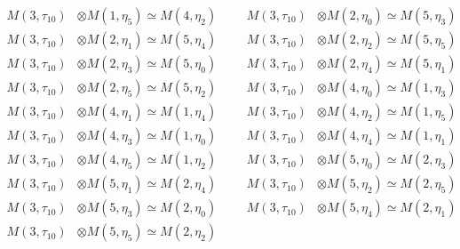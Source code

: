 \begin{align*}
M(3,\tau_{10}) &\otimes M(1,\eta_{5}) \simeq M(4,\eta_{2}) &&& M(3,\tau_{10}) &\otimes M(2,\eta_{0}) \simeq M(5,\eta_{3})\\
M(3,\tau_{10}) &\otimes M(2,\eta_{1}) \simeq M(5,\eta_{4}) &&& M(3,\tau_{10}) &\otimes M(2,\eta_{2}) \simeq M(5,\eta_{5})\\
M(3,\tau_{10}) &\otimes M(2,\eta_{3}) \simeq M(5,\eta_{0}) &&& M(3,\tau_{10}) &\otimes M(2,\eta_{4}) \simeq M(5,\eta_{1})\\
M(3,\tau_{10}) &\otimes M(2,\eta_{5}) \simeq M(5,\eta_{2}) &&& M(3,\tau_{10}) &\otimes M(4,\eta_{0}) \simeq M(1,\eta_{3})\\
M(3,\tau_{10}) &\otimes M(4,\eta_{1}) \simeq M(1,\eta_{4}) &&& M(3,\tau_{10}) &\otimes M(4,\eta_{2}) \simeq M(1,\eta_{5})\\
M(3,\tau_{10}) &\otimes M(4,\eta_{3}) \simeq M(1,\eta_{0}) &&& M(3,\tau_{10}) &\otimes M(4,\eta_{4}) \simeq M(1,\eta_{1})\\
M(3,\tau_{10}) &\otimes M(4,\eta_{5}) \simeq M(1,\eta_{2}) &&& M(3,\tau_{10}) &\otimes M(5,\eta_{0}) \simeq M(2,\eta_{3})\\
M(3,\tau_{10}) &\otimes M(5,\eta_{1}) \simeq M(2,\eta_{4}) &&& M(3,\tau_{10}) &\otimes M(5,\eta_{2}) \simeq M(2,\eta_{5})\\
M(3,\tau_{10}) &\otimes M(5,\eta_{3}) \simeq M(2,\eta_{0}) &&& M(3,\tau_{10}) &\otimes M(5,\eta_{4}) \simeq M(2,\eta_{1})\\
M(3,\tau_{10}) &\otimes M(5,\eta_{5}) \simeq M(2,\eta_{2})
\end{align*}

